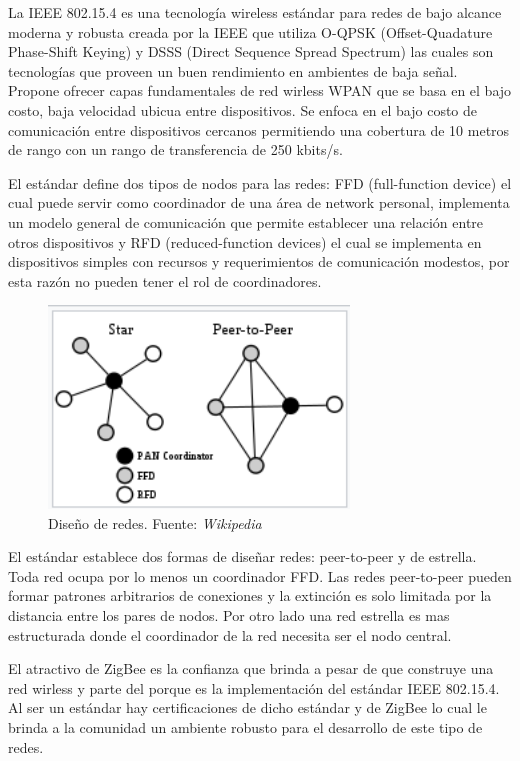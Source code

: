 \documentclass[10pt,journal,compsoc]{IEEEtran}
\begin{document}
La IEEE 802.15.4 es una tecnología wireless  estándar para redes de bajo alcance moderna y robusta creada por la IEEE que utiliza O-QPSK (Offset-Quadature Phase-Shift Keying) y DSSS (Direct Sequence Spread Spectrum) las cuales son tecnologías que proveen un buen rendimiento en ambientes de baja señal. Propone ofrecer capas fundamentales de red wirless WPAN que se basa en el bajo costo, baja velocidad ubicua entre dispositivos. Se enfoca en el bajo costo de comunicación entre dispositivos cercanos permitiendo una cobertura de 10 metros de rango con un rango de transferencia de 250 kbits/s. 

El estándar define dos tipos de nodos para las redes: FFD (full-function device) el cual puede servir como coordinador de una área de network personal, implementa un modelo general de comunicación que permite establecer una relación entre otros dispositivos y RFD (reduced-function devices) el cual se implementa en dispositivos simples con recursos y requerimientos de comunicación modestos, por esta razón no pueden tener el rol de coordinadores. 

\begin{figure}[h]
    \centering
    \includegraphics[width=8cm]{diseno_redes}
    \caption{Diseño de redes. Fuente: \emph{Wikipedia}}
    \label{fig:sdn-arquitectura}
\end{figure}

El estándar establece dos formas de diseñar redes: peer-to-peer y de estrella. Toda red ocupa por lo menos un coordinador FFD. Las redes peer-to-peer pueden formar patrones arbitrarios de conexiones y la extinción es solo limitada por la distancia entre los pares de nodos. Por otro lado una red estrella es mas estructurada donde el coordinador de la red necesita ser el nodo central.

El atractivo de ZigBee es la confianza que brinda a pesar de que construye una red wirless y parte del porque es la implementación del estándar IEEE 802.15.4. Al ser un estándar hay certificaciones de dicho estándar y de ZigBee lo cual le brinda a la comunidad un ambiente robusto para el desarrollo de este tipo de redes.
\end{document}

